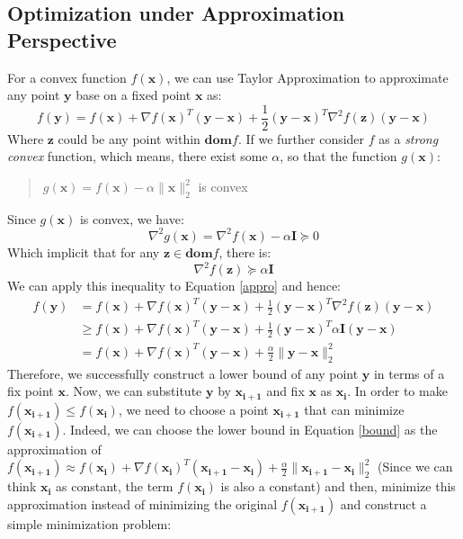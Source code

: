 \documentclass[10pt,a4paper]{article}
\begin{document}
\subsection{Optimization under Approximation Perspective}
For a convex function $f(\mathbf{x})$, we can use Taylor Approximation to approximate any point $\mathbf{y}$ base on a fixed point $\mathbf{x}$ as:
\begin{equation}
		f(\mathbf{y}) = f(\mathbf{x}) + \nabla f(\mathbf{x})^{T} (\mathbf{y} - \mathbf{x}) + \frac{1}{2} (\mathbf{y} - \mathbf{x})^{T} \nabla^{2} f(\mathbf{z}) (\mathbf{y} - \mathbf{x})
		\label{appro}
\end{equation}
Where $\mathbf{z}$ could be any point within $\mathbf{dom} f$. If we further consider $f$ as a \textit{strong convex} function, which means, there exist some $\alpha$, so that the function $g(\mathbf{x})$:
\begin{quote}
	\center
	$g(\mathbf{x}) = f(\mathbf{x}) - \alpha \| \mathbf{x} \|^{2}_{2}$ is convex
\end{quote}
Since $g(\mathbf{x})$ is convex, we have:
\begin{equation*}
	\nabla^{2} g(\mathbf{x}) = \nabla^{2} f(\mathbf{x}) - \alpha \mathbf{I} \succeq 0
\end{equation*}
Which implicit that for any $\mathbf{z} \in \mathbf{dom} f$, there is:
\begin{equation*}
	\nabla^{2} f(\mathbf{z}) \succeq \alpha \mathbf{I}
\end{equation*}
We can apply this inequality to Equation \ref{appro} and hence:
\begin{equation}
	\begin{aligned}
		f(\mathbf{y}) &= f(\mathbf{x}) + \nabla f(\mathbf{x})^{T} (\mathbf{y} - \mathbf{x}) + \frac{1}{2} (\mathbf{y} - \mathbf{x})^{T} \nabla^{2} f(\mathbf{z}) (\mathbf{y} - \mathbf{x}) \\
		&\geq f(\mathbf{x}) + \nabla f(\mathbf{x})^{T} (\mathbf{y} - \mathbf{x}) + \frac{1}{2} (\mathbf{y} - \mathbf{x})^{T} \alpha \mathbf{I} (\mathbf{y} - \mathbf{x}) \\
		&= f(\mathbf{x}) + \nabla f(\mathbf{x})^{T} (\mathbf{y} - \mathbf{x}) + \frac{\alpha}{2} \| \mathbf{y} - \mathbf{x} \|^{2}_{2}
	\end{aligned}
	\label{bound}
\end{equation}
Therefore, we successfully construct a lower bound of any point $\mathbf{y}$ in terms of a fix point $\mathbf{x}$. Now, we can substitute $\mathbf{y}$ by $\mathbf{x_{i + 1}}$ and fix $\mathbf{x}$ as $\mathbf{x_{i}}$. In order to make $f(\mathbf{x_{i + 1}}) \leq f(\mathbf{x_{i}})$, we need to choose a point $\mathbf{x_{i + 1}}$ that can minimize $f(\mathbf{x_{i + 1}})$. Indeed, we can choose the lower bound in Equation \ref{bound} as the approximation of $f(\mathbf{x_{i + 1}}) \approx f(\mathbf{x_{i}}) + \nabla f(\mathbf{x_{i}})^{T} (\mathbf{x_{i + 1}} - \mathbf{x_{i}}) + \frac{\alpha}{2} \| \mathbf{x_{i + 1}} - \mathbf{x_{i}} \|^{2}_{2}$ (Since we can think $\mathbf{x_{i}}$ as constant, the term $f(\mathbf{x_{i}})$ is also a constant) and then, minimize this approximation instead of minimizing the original $f(\mathbf{x_{i + 1}})$ and construct a simple minimization problem:
\end{document}
